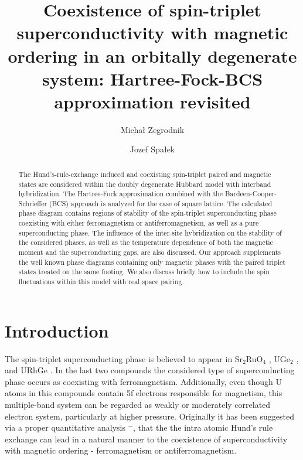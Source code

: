 \documentclass[aps,prb,showpacs,reprint]{revtex4-1}
\begin{document}
\title{Coexistence of spin-triplet superconductivity with magnetic ordering in
an
orbitally degenerate system: Hartree-Fock-BCS approximation revisited}
\author{Micha{\l} Zegrodnik}
\author{Jozef Spa{\l}ek}




\begin{abstract}
The Hund's-rule-exchange induced and coexisting spin-triplet
paired and magnetic states are considered within the doubly degenerate
Hubbard
model with interband hybridization. The Hartree-Fock approximation combined
with the Bardeen-Cooper-Schrieffer (BCS) approach is analyzed for the
case of square
lattice. The calculated phase diagram contains
regions of stability of the spin-triplet superconducting phase coexisting with
either ferromagnetism or antiferromagnetism, as well as a pure superconducting
phase. The influence of the inter-site hybridization on the
stability of the considered phases, as well as the temperature dependence of
both
the
magnetic moment and the superconducting gaps, are also discussed. Our approach
supplements the well known phase diagrams containing only magnetic
phases with the paired triplet states treated on the same footing. We also discuss briefly how to include
the spin fluctuations within this model with real space pairing.
\end{abstract}


\maketitle



\section{Introduction}\label{sec:intro}

The spin-triplet superconducting phase is believed to appear in Sr$_2$RuO$_4$
\cite{Maeno1994}, UGe$_2$ \cite{Saxena2000}, and URhGe \cite{Tateiwa2001}. In
the last two compounds the considered type of superconducting
phase occurs as coexisting with ferromagnetism. Additionally, even though U
atoms in this compounds contain 5f electrons responsible for magnetism, this multiple-band
system can be regarded as weakly or moderately correlated electron system,
particularly at higher pressure. Originally it has been suggested via a proper quantitative analysis
\cite{Klejnberg1999}$^-$\cite{Zegrodnik2011},
that the the intra atomic Hund's rule
exchange can lead in a natural manner to the coexistence of
superconductivity with magnetic ordering - ferromagnetism or
antiferromagnetism. 
\end{document}
